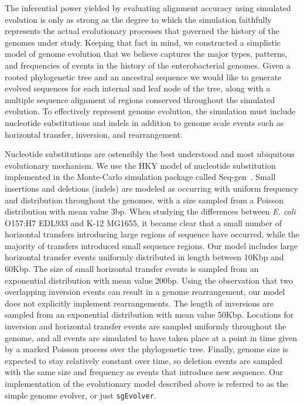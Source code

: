 \documentclass[titlepage,11pt]{article}
\begin{document}
The inferential power yielded by evaluating alignment accuracy using simulated
evolution is only as strong as the degree to which the simulation faithfully
represents the actual
evolutionary processes that governed the history of the genomes under study.
Keeping that fact in mind, we constructed a simplistic model of genome
evolution that we believe captures the major types, patterns, and frequencies
of events in the history of the enterobacterial genomes.  Given a rooted
phylogenetic tree and an ancestral sequence we would like to generate evolved
sequences for each internal and leaf node of the tree, along with a multiple
sequence alignment of regions conserved throughout the simulated evolution. To
effectively represent genome evolution, the simulation must include nucleotide
substitutions and indels in addition to genome scale events such as horizontal
transfer, inversion, and rearrangement.


Nucleotide substitutions are ostensibly the best understood and most ubiquitous
evolutionary mechanism. We use the HKY model of nucleotide substitution implemented
in the Monte-Carlo simulation package called Seq-gen~\citep{seqgen}.  Small
insertions and deletions (indels) are modeled as occurring with uniform
frequency and distribution throughout the genomes, with a size sampled from a
Poisson distribution with mean value 3bp. When studying the differences
between \textit{E. coli} O157:H7 EDL933 and K-12 MG1655, it became clear that a
small number of horizontal transfers introducing large regions of sequence have
occurred, while the majority of transfers introduced small sequence regions.
Our model includes large horizontal transfer events uniformly distributed in
length between 10Kbp and 60Kbp.  The size of small horizontal transfer events
is sampled from an exponential distribution with mean value 200bp.  Using the
observation that two overlapping inversion events can result in a genome
rearrangement, our model does not explicitly implement rearrangements. The
length of inversions are sampled from an exponential distribution with mean
value 50Kbp.  Locations for inversion and horizontal transfer events are
sampled uniformly throughout the genome, and all events are simulated to have taken
place at a point in time given by a marked Poisson process over the phylogenetic tree. 
Finally, genome size is expected to
stay relatively constant over time, so deletion events are sampled with the
same size and frequency as events that introduce new sequence.  Our
implementation of the evolutionary model described above is referred to as the
simple genome evolver, or just \texttt{sgEvolver}.  
\end{document}
